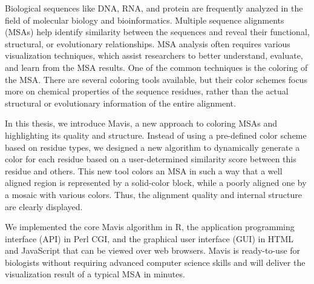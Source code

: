Biological sequences like DNA, RNA, and protein are frequently analyzed in the field of molecular biology and bioinformatics. Multiple sequence alignments (MSAs) help identify similarity between the sequences and reveal their functional, structural, or evolutionary relationships. MSA analysis often requires various visualization techniques, which assist researchers to better understand, evaluate, and learn from the MSA results. One of the common techniques is the coloring of the MSA. There are several coloring tools available, but their color schemes focus more on chemical properties of the sequence residues, rather than the actual structural or evolutionary information of the entire alignment.

In this thesis, we introduce Mavis, a new approach to coloring MSAs and highlighting its quality and structure. Instead of using a pre-defined color scheme based on residue types, we designed a new algorithm to dynamically generate a color for each residue based on a user-determined similarity score between this residue and others. This new tool colors an MSA in such a way that a well aligned region is represented by a solid-color block, while a poorly aligned one by a mosaic with various colors. Thus, the alignment quality and internal structure are clearly displayed.

We implemented the core Mavis algorithm in R, the application programming interface (API) in Perl CGI, and the graphical user interface (GUI) in HTML and JavaScript that can be viewed over web browsers. Mavis is ready-to-use for biologists without requiring advanced computer science skills and will deliver the visualization result of a typical MSA in minutes.